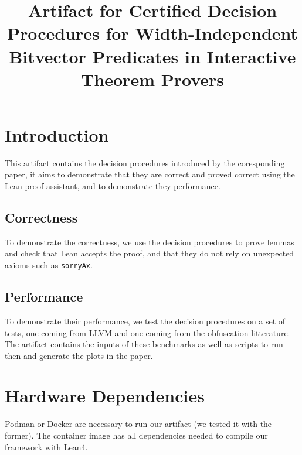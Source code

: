 \documentclass[acmlarge, nonacm]{acmart}
\begin{document}


\appendix
\title[Artifact]{Artifact for Certified Decision Procedures for Width-Independent
Bitvector Predicates in Interactive Theorem Provers}

\maketitle

\section{Introduction}

This artifact contains the decision procedures introduced by the coresponding
paper, it aims to demonstrate that they are correct and proved correct using the
Lean proof assistant, and to demonstrate they performance.

\subsection{Correctness}

To demonstrate the correctness, we use the decision procedures to prove lemmas
and check that Lean accepts the proof, and that they do not rely on unexpected
axioms such as \texttt{sorryAx}.

\subsection{Performance}

To demonstrate their performance, we test the decision procedures on a set of
tests, one coming from LLVM and one coming from the obfuscation litterature. The
artifact contains the inputs of these benchmarks as well as scripts to run then
and generate the plots in the paper.

\section{Hardware Dependencies}

Podman or Docker are necessary to run our artifact (we tested it with the former).
%
The container image has all dependencies needed to compile our framework with Lean4.
\end{document}
